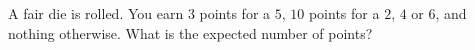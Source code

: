 A fair die is rolled. You earn $3$ points for a $5$, $10$ points for a $2$, $4$ or $6$, and nothing otherwise. What is the expected number of points?
